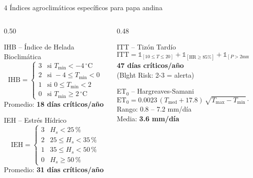 \documentclass[14pt,aspectratio=169]{beamer}
\begin{document}
\begin{frame}{4 \'Indices agroclim\'aticos espec\'ificos para papa andina}
  \begin{columns}[T]
    \begin{column}{0.50\textwidth}
      \begin{block}{\textcolor{agroazul!90!black}{IHB} -- \'Indice de Helada Bioclim\'atica}
        \footnotesize
        \[
          \text{IHB} = \begin{cases}
            3 & \text{si } T_{\min} < -4\,^{\circ}\text{C} \\
            2 & \text{si } -4 \le T_{\min} < 0 \\
            1 & \text{si } 0 \le T_{\min} < 2 \\
            0 & \text{si } T_{\min} \ge 2\,^{\circ}\text{C}
          \end{cases}
        \]
        Promedio: \textbf{18 d\'ias cr\'iticos/a\~no}
      \end{block}

      \vspace{0.3em}
      \begin{block}{\textcolor{agronaranja}{IEH} -- Estr\'es H\'idrico}
        \footnotesize
        \[
          \text{IEH} = \begin{cases}
            3 & H_s < 25\,\% \\
            2 & 25 \le H_s < 35\,\% \\
            1 & 35 \le H_s < 50\,\% \\
            0 & H_s \ge 50\,\%
          \end{cases}
        \]
        Promedio: \textbf{31 d\'ias cr\'iticos/a\~no}
      \end{block}
    \end{column}

    \begin{column}{0.48\textwidth}
      \begin{block}{\textcolor{agrorojo}{ITT} -- Tiz\'on Tard\'io}
        \footnotesize
        \[
          \text{ITT} =
          \mathbb{1}_{[10\le T\le 20]}
          + \mathbb{1}_{[\text{HR}\ge 85\%]}
          + \mathbb{1}_{[P>2\text{mm}]}
        \]
        \textbf{47 d\'ias cr\'iticos/a\~no}\\
        (Blght Risk: 2-3 = alerta)
      \end{block}

      \vspace{0.3em}
      \begin{block}{\textcolor{agrolight}{ET$_0$} -- Hargreaves-Samani}
        \footnotesize
        \[
          \text{ET}_0 = 0.0023\,
          (T_{\text{med}}+17.8)\,
          \sqrt{T_{\max}-T_{\min}}\cdot R_a
        \]
        Rango: 0.8 -- 7.2 mm/d\'ia\\
        Media: \textbf{3.6 mm/d\'ia}
      \end{block}


\end{column}
\end{columns}
\end{frame}
\end{document}

